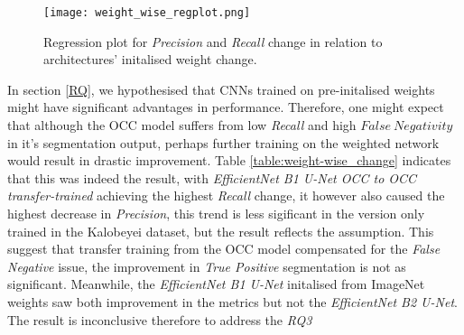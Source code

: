 \documentclass[11pt, a4paper, twoside]{report}
\begin{document}
\begin{table}[H]
  \centering
  \label{table:weight-wise_change}
  \caption{Initalised weight change in available CNNs and their effects on the metrics}
\end{table}

\begin{figure}[H]
  \centering
  \texttt{[image: weight\_wise\_regplot.png]}
  \caption{Regression plot for \textit{Precision} and \textit{Recall} change in relation to architectures' initalised weight change.}
  \label{fig:weight_regplot}
\end{figure}

In section \ref{RQ}, we hypothesised that CNNs trained on pre-initalised weights might have significant advantages in performance. Therefore, one might expect that although the OCC model suffers from low \textit{Recall} and high $False\ Negativity$ in it's segmentation output, perhaps further training on the weighted network would result in drastic improvement. Table \ref{table:weight-wise_change} indicates that this was indeed the result, with \textit{EfficientNet B1 U-Net OCC to OCC transfer-trained} achieving the highest \textit{Recall} change, it however also caused the highest decrease in \textit{Precision}, this trend is less sigificant in the version only trained in the Kalobeyei dataset, but the result reflects the assumption. This suggest that transfer training from the OCC model compensated for the \textit{False Negative} issue, the improvement in \textit{True Positive} segmentation is not as significant. Meanwhile, the \textit{EfficientNet B1 U-Net} initalised from ImageNet weights saw both improvement in the metrics but not the \textit{EfficientNet B2 U-Net}. The result is inconclusive therefore to address the \textit{RQ3}\\\par
\end{document}
